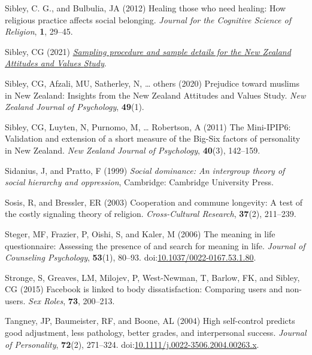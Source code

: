 \documentclass[
  single column]{article}
\newlength{\cslhangindent}
\newenvironment{CSLReferences}[2] %
 {\begin{list}{}{%
  \setlength{\itemindent}{0pt}
  \setlength{\leftmargin}{0pt}
  \setlength{\parsep}{0pt}
  \ifodd #1
   \setlength{\leftmargin}{\cslhangindent}
   \setlength{\itemindent}{-1\cslhangindent}
  \fi
  \setlength{\itemsep}{#2\baselineskip}}}
 {\end{list}}
\begin{document}
\begin{CSLReferences}{1}{0}
Sibley, C. G., and Bulbulia, JA (2012) Healing those who need healing:
How religious practice affects social belonging. \emph{Journal for the
Cognitive Science of Religion}, \textbf{1}, 29--45.

Sibley, CG (2021)
\emph{\href{https://doi.org/10.31234/osf.io/wgqvy}{Sampling procedure
and sample details for the {N}ew {Z}ealand {A}ttitudes and {V}alues
{S}tudy}}.

Sibley, CG, Afzali, MU, Satherley, N, \ldots{} others (2020) Prejudice
toward muslims in {N}ew {Z}ealand: Insights from the {N}ew {Z}ealand
{A}ttitudes and {V}alues {S}tudy. \emph{New Zealand Journal of
Psychology}, \textbf{49}(1).

Sibley, CG, Luyten, N, Purnomo, M, \ldots{} Robertson, A (2011) The
Mini-IPIP6: Validation and extension of a short measure of the Big-Six
factors of personality in {N}ew {Z}ealand. \emph{New Zealand Journal of
Psychology}, \textbf{40}(3), 142--159.

Sidanius, J, and Pratto, F (1999) \emph{Social dominance: An intergroup
theory of social hierarchy and oppression}, Cambridge: Cambridge
University Press.

Sosis, R, and Bressler, ER (2003) Cooperation and commune longevity: A
test of the costly signaling theory of religion. \emph{Cross-Cultural
Research}, \textbf{37}(2), 211--239.

Steger, MF, Frazier, P, Oishi, S, and Kaler, M (2006) The meaning in
life questionnaire: Assessing the presence of and search for meaning in
life. \emph{Journal of Counseling Psychology}, \textbf{53}(1), 80--93.
doi:\href{https://doi.org/10.1037/0022-0167.53.1.80}{10.1037/0022-0167.53.1.80}.

Stronge, S, Greaves, LM, Milojev, P, West-Newman, T, Barlow, FK, and
Sibley, CG (2015) Facebook is linked to body dissatisfaction: Comparing
users and non-users. \emph{Sex Roles}, \textbf{73}, 200--213.

Tangney, JP, Baumeister, RF, and Boone, AL (2004) High self-control
predicts good adjustment, less pathology, better grades, and
interpersonal success. \emph{Journal of Personality}, \textbf{72}(2),
271--324.
doi:\href{https://doi.org/10.1111/j.0022-3506.2004.00263.x}{10.1111/j.0022-3506.2004.00263.x}.


\end{CSLReferences}
\end{document}

